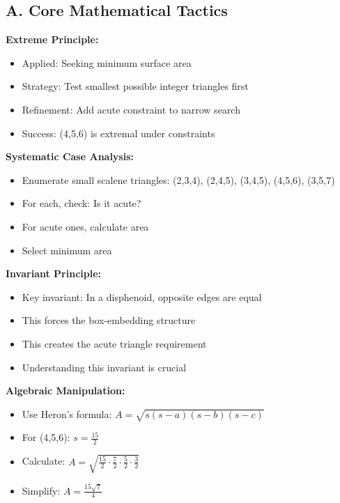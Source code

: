 \documentclass[12pt]{article}
\begin{document}
\begin{tacticalbox}

\subsection*{A. Core Mathematical Tactics}

\textbf{Extreme Principle:}
\begin{itemize}
    \item Applied: Seeking minimum surface area
    \item Strategy: Test smallest possible integer triangles first
    \item Refinement: Add acute constraint to narrow search
    \item Success: (4,5,6) is extremal under constraints
\end{itemize}

\textbf{Systematic Case Analysis:}
\begin{itemize}
    \item Enumerate small scalene triangles: (2,3,4), (2,4,5), (3,4,5), (4,5,6), (3,5,7)
    \item For each, check: Is it acute?
    \item For acute ones, calculate area
    \item Select minimum area
\end{itemize}

\textbf{Invariant Principle:}
\begin{itemize}
    \item Key invariant: In a disphenoid, opposite edges are equal
    \item This forces the box-embedding structure
    \item This creates the acute triangle requirement
    \item Understanding this invariant is crucial
\end{itemize}

\textbf{Algebraic Manipulation:}
\begin{itemize}
    \item Use Heron's formula: $A = \sqrt{s(s-a)(s-b)(s-c)}$
    \item For (4,5,6): $s = \frac{15}{2}$
    \item Calculate: $A = \sqrt{\frac{15}{2} \cdot \frac{7}{2} \cdot \frac{5}{2} \cdot \frac{3}{2}}$
    \item Simplify: $A = \frac{15\sqrt{7}}{4}$
\end{itemize}


\end{tacticalbox}
\end{document}
